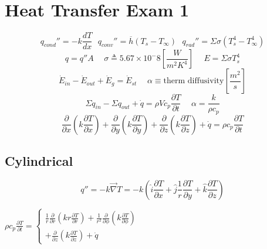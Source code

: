 \documentclass[twocolumn, 12pt]{article}
\begin{document}
\small


\section*{Heat Transfer Exam 1}
\begin{equation*}
    q_{cond}'' = -k\frac{dT}{dx}  \hspace{8pt} q_{conv}'' = \overline{h} (T_s-T_{\infty}) \hspace{8pt} q_{rad}'' = \Sigma \sigma (T_s^4 -T_{\infty}^4)
\end{equation*}
\begin{equation*}
    q = q''A    \hspace{15pt}    \sigma \triangleq 5.67 \times 10^-8 \left[\frac{W}{m^2K^4}\right] \hspace{15pt} E = \Sigma \sigma T_s^4
\end{equation*}
\begin{equation*}
     \dot{E}_{in} - \dot{E}_{out} + \dot{E}_g = \dot{E}_{st} \hspace{15pt} \alpha \equiv \text{therm diffusivity} \left[\frac{m^2}{s}\right]
\end{equation*}
\begin{equation*}
    \Sigma q_{in} -\Sigma q_{out} +\dot{q} = \rho Vc_p\frac{\partial T}{\partial t}  \hspace{15pt} \alpha = \frac{k}{\rho c_p}
\end{equation*}
\begin{equation*}
    \frac{\partial}{\partial x}\left( k \frac{\partial T}{\partial x}\right) +\frac{\partial}{\partial y}\left( k \frac{\partial T}{\partial y}\right) +\frac{\partial}{\partial z}\left( k \frac{\partial T}{\partial z}\right) + \dot{q} = \rho c_p \frac{\partial T}{\partial t}
\end{equation*}


\subsection*{Cylindrical}
    \begin{equation*}
        q'' = -k\Vec{\nabla} T = -k\left( \hat{i} \frac{\partial T}{\partial x} + \hat{j} \frac{1}{r}\frac{\partial T}{\partial y} + \hat{k} \frac{\partial T}{\partial z}\right)
    \end{equation*}
    \begin{center}
    \(
        \rho c_p \frac{\partial T}{\partial t} = 
        \begin{cases}
                    \frac{1}{r} \frac{\partial}{\partial r}\left( kr\frac{\partial T}{\partial r} \right) +\frac{1}{r^2} \frac{\partial }{\partial \phi} \left( k\frac{\partial T}{\partial \phi}\right)\\
                    +\frac{\partial }{\partial z}\left(k\frac{\partial T}{\partial z} \right) +\dot{q}
        \end{cases}
    \)
    \end{center}
\end{document}
